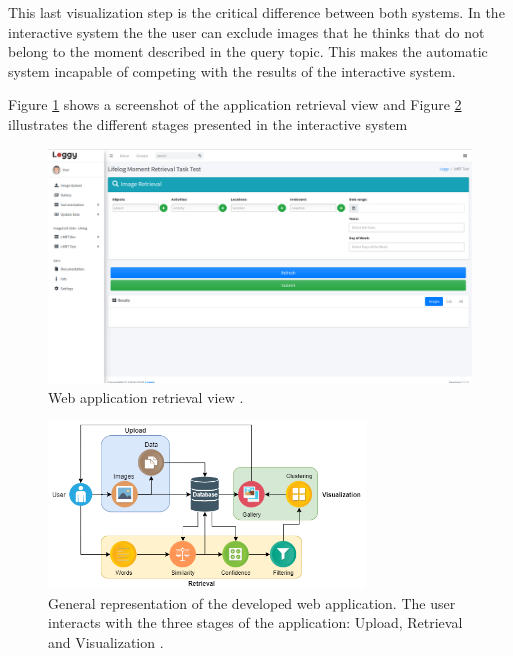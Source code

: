 This last visualization step is the critical difference between both systems. In the interactive system the the user can exclude images that he thinks that do not belong to the moment described in the query topic. This makes the automatic system incapable of competing with the results of the interactive system.

Figure \ref{fig:app_view} shows a screenshot of the application retrieval view and Figure \ref{fig:app_diagram} illustrates the different stages presented in the interactive system 

\begin{figure}[H]
  \centering
  \captionsetup{justification=centering}

  \includegraphics[width=\textwidth]{Sections/7Results/images/retrievalview.png} 
  \caption[Web application retrievable view] {Web application retrieval view \cite{Ribeiro2020}.}
  \label{fig:app_view}
\end{figure}

\begin{figure}[H]
  \centering
  \captionsetup{justification=centering}

  \includegraphics[width=0.75\textwidth]{Sections/7Results/images/Appdiagram.png} 
  \caption[General representation of the  developed  web  application.]{General representation of the  developed  web  application.  The  user  interacts with the three stages of the application: Upload, Retrieval and Visualization \cite{Ribeiro2020}.}
  \label{fig:app_diagram}
\end{figure}


